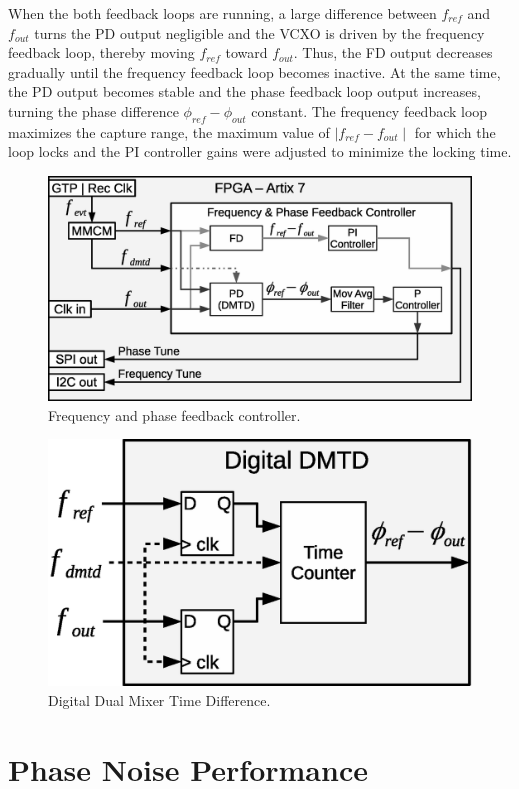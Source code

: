 \documentclass[a4paper,
               biblatex,      %
               ]{jacow}
\begin{document}
When the both feedback loops are running, a large difference between $f_{ref}$ and $f_{out}$ turns the PD output negligible and the VCXO is driven by the frequency feedback loop, thereby moving $f_{ref}$ toward $f_{out}$. Thus, the FD output decreases gradually until the frequency feedback loop becomes inactive. At the same time, the PD output becomes stable and the phase feedback loop output increases, turning the phase difference $\phi_{ref}-\phi_{out}$ constant. The frequency feedback loop maximizes the capture range, the maximum value of ${\mid f_{ref}-f_{out} \mid}$ for which the loop locks and the PI controller gains were adjusted to minimize the locking time.

\begin{figure}[!htb]
   \centering
   \includegraphics*[width=0.9\columnwidth]{AFCFPGADMTD}
   \caption{Frequency and phase feedback controller.}
   \label{fig:AFCFPGADMTD}
\end{figure}

\begin{figure}[!htb]
   \centering
   \includegraphics*[width=0.8\columnwidth]{DigitalDMTD}
   \caption{Digital Dual Mixer Time Difference.}
   \label{fig:DigitalDMTD}
\end{figure}

\section{Phase Noise Performance}
\end{document}
